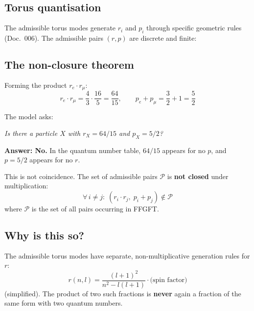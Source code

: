 \subsection{Torus quantisation}

The admissible torus modes generate $r_i$ and $p_i$ through specific geometric
rules (Doc.~006). The admissible pairs $(r,p)$ are discrete and finite:

\begin{center}
{\footnotesize
{}
}
\end{center}

\subsection{The non-closure theorem}

Forming the product $r_e \cdot r_\mu$:
\[
  r_e \cdot r_\mu = \frac{4}{3} \cdot \frac{16}{5} = \frac{64}{15},
  \qquad p_e + p_\mu = \frac{3}{2} + 1 = \frac{5}{2}
\]

The model asks:
\begin{center}
  \emph{Is there a particle $X$ with $r_X = 64/15$ and $p_X = 5/2$?}
\end{center}

\textbf{Answer: No.} In the quantum number table, $64/15$ appears for
no $p$, and $p=5/2$ appears for no $r$.

This is not coincidence. The set of admissible pairs $\mathcal{P}$
is \textbf{not closed} under multiplication:
\[
  \forall\, i \neq j:\; (r_i \cdot r_j,\; p_i + p_j) \notin \mathcal{P}
\]
where $\mathcal{P}$ is the set of all pairs occurring in FFGFT.

\subsection{Why is this so?}

The admissible torus modes have separate, non-multiplicative generation rules for $r$:
\[
  r(n,l) = \frac{(l+1)^2}{n^2 - l(l+1)} \cdot \text{(spin factor)}
\]
(simplified). The product of two such fractions is \textbf{never} again
a fraction of the same form with two quantum numbers.

